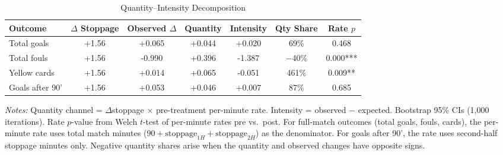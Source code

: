 \begin{table}[htbp]
\centering
\caption{Quantity--Intensity Decomposition}
\label{tab:decomposition_v3}
\begin{threeparttable}
\begin{tabular}{lcccccc}
\toprule
Outcome & $\Delta$ Stoppage & Observed $\Delta$ & Quantity & Intensity & Qty Share & Rate $p$ \\
\midrule
  Total goals & +1.56 & +0.065 & +0.044 & +0.020 & 69\% & 0.468 \\
  Total fouls & +1.56 & -0.990 & +0.396 & -1.387 & $-$40\% & 0.000*** \\
  Yellow cards & +1.56 & +0.014 & +0.065 & -0.051 & 461\% & 0.009** \\
  Goals after 90' & +1.56 & +0.053 & +0.046 & +0.007 & 87\% & 0.685 \\
\bottomrule
\end{tabular}
\begin{tablenotes}[flushleft]\footnotesize
\item \textit{Notes:} Quantity channel = $\Delta$stoppage $\times$ pre-treatment per-minute rate. Intensity = observed $-$ expected. Bootstrap 95\% CIs (1,000 iterations). Rate $p$-value from Welch $t$-test of per-minute rates pre vs.\ post. For full-match outcomes (total goals, fouls, cards), the per-minute rate uses total match minutes ($90 + \text{stoppage}_{1H} + \text{stoppage}_{2H}$) as the denominator. For goals after 90', the rate uses second-half stoppage minutes only. Negative quantity shares arise when the quantity and observed changes have opposite signs.
\end{tablenotes}
\end{threeparttable}
\end{table}
